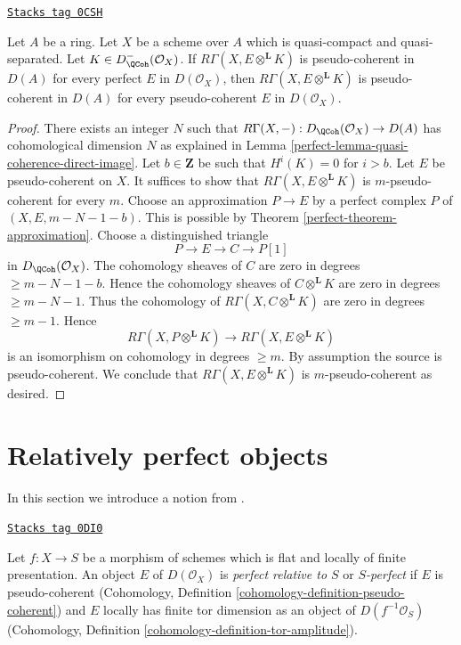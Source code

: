 \begin{lemma}
\label{perfect-lemma-perfect-enough}
\href{https://stacks.math.columbia.edu/tag/0CSH}{\texttt{Stacks tag 0CSH}}

Let $A$ be a ring. Let $X$ be a scheme over $A$ which is quasi-compact
and quasi-separated. Let $K \in D^-_\QCoh(\mathcal{O}_X)$.
If $R\Gamma(X, E \otimes^\mathbf{L} K)$ is pseudo-coherent
in $D(A)$ for every perfect $E$ in $D(\mathcal{O}_X)$,
then $R\Gamma(X, E \otimes^\mathbf{L} K)$ is pseudo-coherent
in $D(A)$ for every pseudo-coherent $E$ in $D(\mathcal{O}_X)$.
\end{lemma}

\begin{proof}

There exists an integer $N$ such that
$R\Gamma(X, -) : D_\QCoh(\mathcal{O}_X) \to D(A)$
has cohomological dimension $N$ as explained in
Lemma \ref{perfect-lemma-quasi-coherence-direct-image}.
Let $b \in \mathbf{Z}$ be such that $H^i(K) = 0$ for $i > b$.
Let $E$ be pseudo-coherent on $X$.
It suffices to show that $R\Gamma(X, E \otimes^\mathbf{L} K)$
is $m$-pseudo-coherent for every $m$.
Choose an approximation $P \to E$ by a perfect complex $P$
of $(X, E, m - N - 1 - b)$. This is possible by
Theorem \ref{perfect-theorem-approximation}.
Choose a distinguished triangle
$$
P \to E \to C \to P[1]
$$
in $D_\QCoh(\mathcal{O}_X)$. The cohomology sheaves of $C$ are zero
in degrees $\geq m - N - 1 - b$. Hence the cohomology
sheaves of $C \otimes^\mathbf{L} K$ are zero in degrees $\geq m - N - 1$.
Thus the cohomology of $R\Gamma(X, C \otimes^\mathbf{L} K)$
are zero in degrees $\geq m - 1$. Hence
$$
R\Gamma(X, P \otimes^\mathbf{L} K) \to R\Gamma(X, E \otimes^\mathbf{L} K)
$$
is an isomorphism on cohomology in degrees $\geq m$.
By assumption the source is pseudo-coherent.
We conclude that $R\Gamma(X, E \otimes^\mathbf{L} K)$
is $m$-pseudo-coherent as desired.
\end{proof}

\section{Relatively perfect objects}
\label{perfect-section-relatively-perfect}
In this section we introduce a notion from
\cite{lieblich-complexes}.

\begin{definition}
\label{perfect-definition-relatively-perfect}
\href{https://stacks.math.columbia.edu/tag/0DI0}{\texttt{Stacks tag 0DI0}}

Let $f : X \to S$ be a morphism of schemes which is flat and
locally of finite presentation. An object $E$ of $D(\mathcal{O}_X)$ is
{\it perfect relative to $S$} or
{\it $S$-perfect} if $E$ is pseudo-coherent
(Cohomology, Definition \ref{cohomology-definition-pseudo-coherent}) and
$E$ locally has finite tor dimension as an object of
$D(f^{-1}\mathcal{O}_S)$
(Cohomology, Definition \ref{cohomology-definition-tor-amplitude}).
\end{definition}

